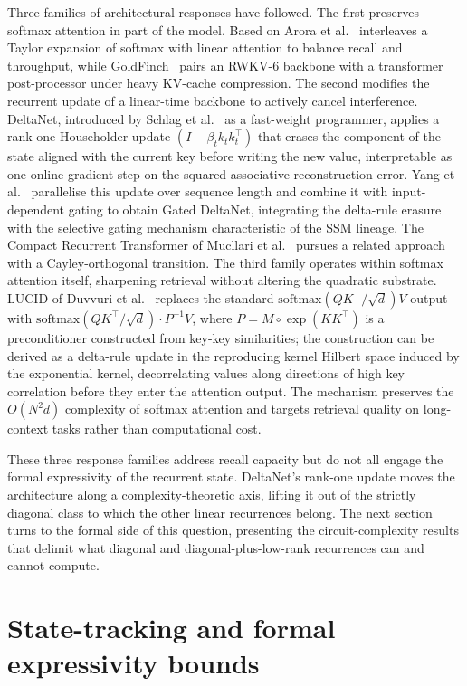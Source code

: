 Three families of architectural responses have followed. The
first preserves softmax attention in part of the model. Based on
Arora et al.~\cite{arora2024based} interleaves a Taylor expansion
of softmax with linear attention to balance recall and
throughput, while GoldFinch~\cite{goldstein2024goldfinch} pairs
an RWKV-6 backbone with a transformer post-processor under heavy
KV-cache compression. The second modifies the recurrent update
of a linear-time backbone to actively cancel interference.
DeltaNet, introduced by Schlag et al.~\cite{schlag2021deltanet}
as a fast-weight programmer, applies a rank-one Householder
update $(I - \beta_t k_t k_t^\top)$ that erases the component of
the state aligned with the current key before writing the new
value, interpretable as one online gradient step on the squared
associative reconstruction error. Yang et
al.~\cite{yang2024deltanet} parallelise this update over sequence
length and combine it with input-dependent gating to obtain
Gated DeltaNet, integrating the delta-rule erasure with the
selective gating mechanism characteristic of the SSM lineage.
The Compact Recurrent Transformer of Mucllari et
al.~\cite{mucllari2025crt} pursues a related approach with a
Cayley-orthogonal transition. The third family operates within
softmax attention itself, sharpening retrieval without altering
the quadratic substrate. LUCID of Duvvuri et
al.~\cite{duvvuri2026lucid} replaces the standard
$\mathrm{softmax}(QK^\top/\sqrt{d}) V$ output with
$\mathrm{softmax}(QK^\top/\sqrt{d}) \cdot P^{-1} V$, where
$P = M \circ \exp(KK^\top)$ is a preconditioner constructed from
key-key similarities; the construction can be derived as a
delta-rule update in the reproducing kernel Hilbert space induced
by the exponential kernel, decorrelating values along directions
of high key correlation before they enter the attention output.
The mechanism preserves the $O(N^2 d)$ complexity of softmax
attention and targets retrieval quality on long-context tasks
rather than computational cost.

These three response families address recall capacity but do not
all engage the formal expressivity of the recurrent state.
DeltaNet's rank-one update moves the architecture along a
complexity-theoretic axis, lifting it out of the strictly
diagonal class to which the other linear recurrences belong. The
next section turns to the formal side of this question,
presenting the circuit-complexity results that delimit what
diagonal and diagonal-plus-low-rank recurrences can and cannot
compute.

  \section{State-tracking and formal expressivity bounds}


